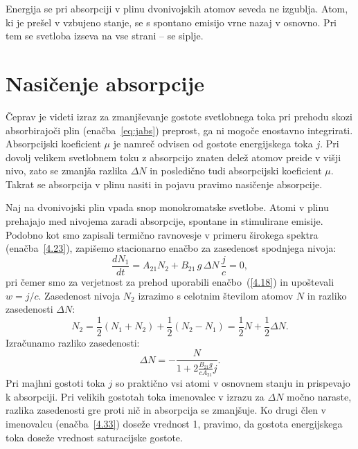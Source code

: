 \begin{remark}
Energija se pri absorpciji v plinu dvonivojskih atomov seveda
ne izgublja. Atom, ki je prešel v vzbujeno stanje, se s spontano 
emisijo vrne nazaj v osnovno. Pri tem se svetloba izseva na vse strani -- se siplje. 
\end{remark}

\section{Nasičenje absorpcije}
\label{chap:NasAbs}
Čeprav je videti izraz za zmanjševanje 
gostote svetlobnega toka pri prehodu skozi absorbirajoči plin (enačba~\ref{eq:jabs}) 
preprost, ga ni mogoče enostavno integrirati. Absorpcijski koeficient 
$\mu$ je namreč odvisen od 
gostote energijskega toka $j$. Pri dovolj velikem svetlobnem toku z 
absorpcijo znaten delež atomov preide v višji nivo, zato se zmanjša razlika $\Delta N$
in posledično tudi absorpcijski koeficient $\mu$. Takrat se absorpcija
v plinu nasiti in pojavu pravimo nasičenje absorpcije.

Naj na dvonivojski plin vpada snop monokromatske svetlobe. 
Atomi v plinu prehajajo med nivojema zaradi absorpcije, spontane in stimulirane emisije. 
Podobno kot smo zapisali termično ravnovesje v primeru
širokega spektra (enačba~\ref{4.23}), zapišemo stacionarno enačbo za
zasedenost spodnjega nivoja:
\begin{equation}
\frac{dN_{1}}{dt}=A_{21}N_{2}+B_{21}\,g\,\Delta N\,\frac{j}{c}=0,
\label{4.32}
\end{equation}
pri čemer smo za verjetnost za prehod uporabili
enačbo~(\ref{4.18}) in upoštevali $w=j/c$. Zasedenost nivoja $N_{2}$ izrazimo s 
celotnim številom atomov $N$ in razliko zasedenosti $\Delta N$:
\begin{equation}
N_{2}=\frac{1}{2}(N_1+N_2) + \frac{1}{2}(N_2-N_1) = \frac{1}{2}N+\frac{1}{2}\Delta N.
\label{4.321}
\end{equation}
Izračunamo razliko zasedenosti:
\begin{equation}
\Delta N=-\frac{N}{1+2\frac{B_{21}g}{cA_{21}}j}.
\label{4.33}
\end{equation}
Pri majhni gostoti toka $j$ so praktično vsi atomi v osnovnem stanju in prispevajo
k absorpciji. Pri velikih gostotah toka  imenovalec v izrazu za $\Delta N$
močno naraste, razlika zasedenosti gre proti nič in absorpcija se zmanjšuje.
Ko drugi člen v imenovalcu (enačba~\ref{4.33}) doseže vrednost 1, pravimo, da
gostota energijskega toka doseže vrednost saturacijske gostote.

